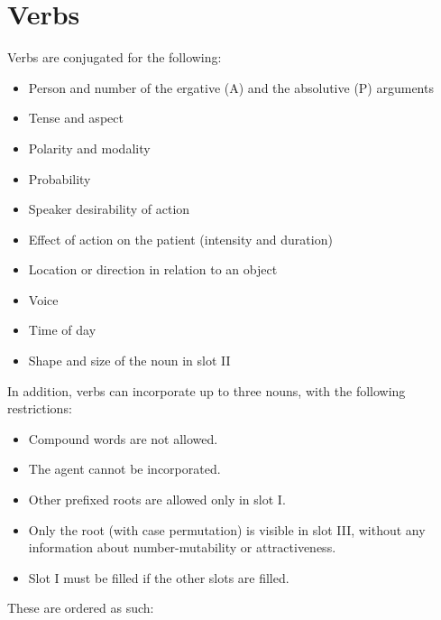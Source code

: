 \documentclass{book}
\begin{document}
\chapter{Verbs}

Verbs are conjugated for the following:

\begin{itemize}
  \item Person and number of the ergative (A) and the absolutive (P) arguments
  \item Tense and aspect
  \item Polarity and modality
  \item Probability
  \item Speaker desirability of action
  \item Effect of action on the patient (intensity and duration)
  \item Location or direction in relation to an object
  \item Voice
  \item Time of day
  \item Shape and size of the noun in slot II
\end{itemize}

In addition, verbs can incorporate up to three nouns, with the following restrictions:

\begin{itemize}
  \item Compound words are not allowed.
  \item The agent cannot be incorporated.
  \item Other prefixed roots are allowed only in slot I.
  \item Only the root (with case permutation) is visible in slot III, without any information about number-mutability or attractiveness.
  \item Slot I must be filled if the other slots are filled.
\end{itemize}

These are ordered as such:
\end{document}
